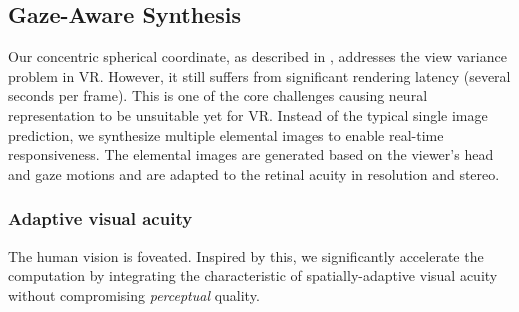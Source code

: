 \subsection{Gaze-Aware Synthesis}
\label{sec:synthesis}
Our concentric spherical coordinate, as described in , addresses the view variance problem in VR. However, it still suffers from significant rendering latency (several seconds per frame). This is one of the core challenges causing neural representation to be unsuitable yet for VR. Instead of the typical single image prediction, we synthesize multiple elemental images to enable real-time responsiveness.
The elemental images are generated based on the viewer's head and gaze motions and are adapted to the retinal acuity in resolution and stereo. %

\subsubsection{Adaptive visual acuity}
The human vision is foveated. Inspired by this, we significantly accelerate the computation by integrating the characteristic of spatially-adaptive visual acuity without compromising {\it perceptual} quality.

